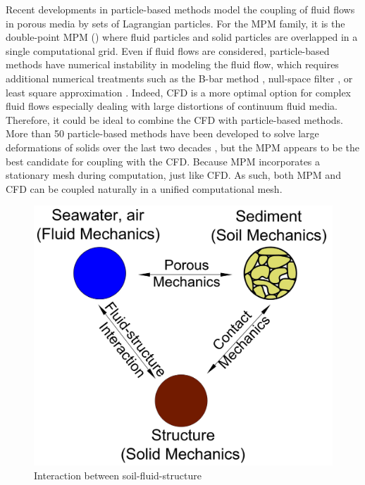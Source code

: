 \documentclass[preprint,12pt]{elsarticle}
\begin{document}
Recent developments in particle-based methods model the coupling of fluid flows in porous media by sets of Lagrangian particles. For the MPM family, it is the double-point MPM (\cite{Bandara2015, Tampubolon2017, Baumgarten2019}) where fluid particles and solid particles are overlapped in a single computational grid. Even if fluid flows are considered, particle-based methods have numerical instability in modeling the fluid flow, which requires additional numerical treatments such as the B-bar method \cite{Bandara2015}, null-space filter \cite{nullspace}, or least square approximation \cite{Zheng2021, CPLS}. Indeed, CFD is a more optimal option for complex fluid flows especially dealing with large distortions of continuum fluid media. Therefore, it could be ideal to combine the CFD with particle-based methods. More than 50 particle-based methods have been developed to solve large deformations of solids over the last two decades \cite{Chen2017}, but the MPM appears to be the best candidate for coupling with the CFD. Because MPM incorporates a stationary mesh during computation, just like CFD. As such, both MPM and CFD can be coupled naturally in a unified computational mesh.\\
%
%
\begin{figure}[h]
\center
\includegraphics[scale=.3]{3phases.jpg}
\caption{Interaction between soil-fluid-structure}
\label{fig:3phases}
\end {figure}
%
%
\end{document}
